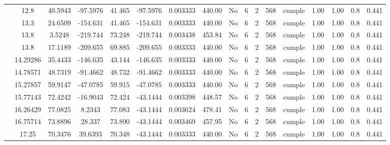 \begin{table}[H]
{\begin{tabular}{|c|c|c|c|c|c|c|c|c|c|c|c|c|c|c|c|c|}
\cline{2-17}        & 12.8 & 40.5943 & -97.5976 & 41.465 & -97.5976 & 0.003333 & 440.00 & No  & 6   & 2   & 568 & \cellcolor[rgb]{ .776,  .937,  .808}cumple & 1.00 & 1.00 & 0.8 & 0.441 \bigstrut\\
\cline{2-17}        & 13.3 & 24.6509 & -154.631 & 41.465 & -154.631 & 0.003333 & 440.00 & No  & 6   & 2   & 568 & \cellcolor[rgb]{ .776,  .937,  .808}cumple & 1.00 & 1.00 & 0.8 & 0.441 \bigstrut\\
\cline{2-17}        & \cellcolor[rgb]{ .851,  .882,  .949}13.8 & 3.5248 & -219.744 & 73.248 & -219.744 & 0.003438 & 453.84 & No  & 6   & 2   & 568 & \cellcolor[rgb]{ .776,  .937,  .808}cumple & 1.00 & 1.00 & 0.8 & 0.441 \bigstrut\\
\cline{2-17}        & \cellcolor[rgb]{ .851,  .882,  .949}13.8 & 17.1189 & -209.655 & 69.885 & -209.655 & 0.003333 & 440.00 & No  & 6   & 2   & 568 & \cellcolor[rgb]{ .776,  .937,  .808}cumple & 1.00 & 1.00 & 0.8 & 0.441 \bigstrut\\
\cline{2-17}        & 14.29286 & 35.4433 & -146.635 & 43.144 & -146.635 & 0.003333 & 440.00 & No  & 6   & 2   & 568 & \cellcolor[rgb]{ .776,  .937,  .808}cumple & 1.00 & 1.00 & 0.8 & 0.441 \bigstrut\\
\cline{2-17}        & 14.78571 & 48.7319 & -91.4662 & 48.732 & -91.4662 & 0.003333 & 440.00 & No  & 6   & 2   & 568 & \cellcolor[rgb]{ .776,  .937,  .808}cumple & 1.00 & 1.00 & 0.8 & 0.441 \bigstrut\\
\cline{2-17}        & 15.27857 & 59.9147 & -47.0785 & 59.915 & -47.0785 & 0.003333 & 440.00 & No  & 6   & 2   & 568 & \cellcolor[rgb]{ .776,  .937,  .808}cumple & 1.00 & 1.00 & 0.8 & 0.441 \bigstrut\\
\cline{2-17}        & 15.77143 & 72.4242 & -16.9043 & 72.424 & -43.1444 & 0.003398 & 448.57 & No  & 6   & 2   & 568 & \cellcolor[rgb]{ .776,  .937,  .808}cumple & 1.00 & 1.00 & 0.8 & 0.441 \bigstrut\\
\cline{2-17}        & 16.26429 & 77.0825 & 8.2343 & 77.083 & -43.1444 & 0.003624 & 478.41 & No  & 6   & 2   & 568 & \cellcolor[rgb]{ .776,  .937,  .808}cumple & 1.00 & 1.00 & 0.8 & 0.441 \bigstrut\\
\cline{2-17}        & 16.75714 & 73.8896 & 28.337 & 73.890 & -43.1444 & 0.003469 & 457.95 & No  & 6   & 2   & 568 & \cellcolor[rgb]{ .776,  .937,  .808}cumple & 1.00 & 1.00 & 0.8 & 0.441 \bigstrut\\
\cline{2-17}        & 17.25 & 70.3476 & 39.6393 & 70.348 & -43.1444 & 0.003333 & 440.00 & No  & 6   & 2   & 568 & \cellcolor[rgb]{ .776,  .937,  .808}cumple & 1.00 & 1.00 & 0.8 & 0.441 \bigstrut\\

\end{tabular}}
\end{table}
